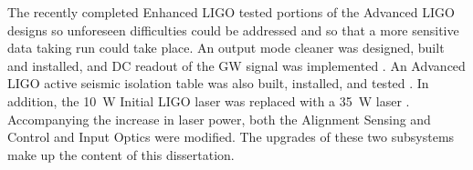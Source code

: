 The recently completed Enhanced LIGO tested portions of the Advanced
LIGO designs so unforeseen difficulties could be addressed and so that
a more sensitive data taking run could take place. An output mode
cleaner was designed, built and installed, and DC readout of the GW
signal was implemented \cite{Fricke2011DC}. An Advanced LIGO active
seismic isolation table was also built, installed, and tested
\cite{KisselThesis}. In addition, the 10~W Initial LIGO laser was
replaced with a 35~W laser \cite{Frede2007Fundamental}. Accompanying
the increase in laser power, both the Alignment Sensing and Control
and Input Optics were modified. The upgrades of these two subsystems
make up the content of this dissertation. 








